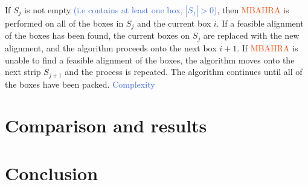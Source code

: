 \documentclass[oribibl]{llncs}
\begin{document}
If $S_j$ is not empty \textcolor{RoyalBlue}{(i.e contains at least one box, $|S_j| > 0$)}, then \textcolor{OrangeRed}{MBAHRA} is performed on all of the boxes in $S_j$ and the current box $i$. If a feasible alignment of the boxes has been found, the current boxes on $S_j$ are replaced with the new alignment, and the algorithm proceeds onto the next box $i+1$. If \textcolor{OrangeRed}{MBAHRA} is unable to find a feasible alignment of the boxes, the algorithm moves onto the next strip $S_{j+1}$ and the process is repeated. The algorithm continues until all of the boxes have been packed. \textcolor{RoyalBlue}{Complexity}




\section{Comparison and results}
\label{sec:comparison}

\section{Conclusion}
\label{sec:conclusion}















\end{document}
